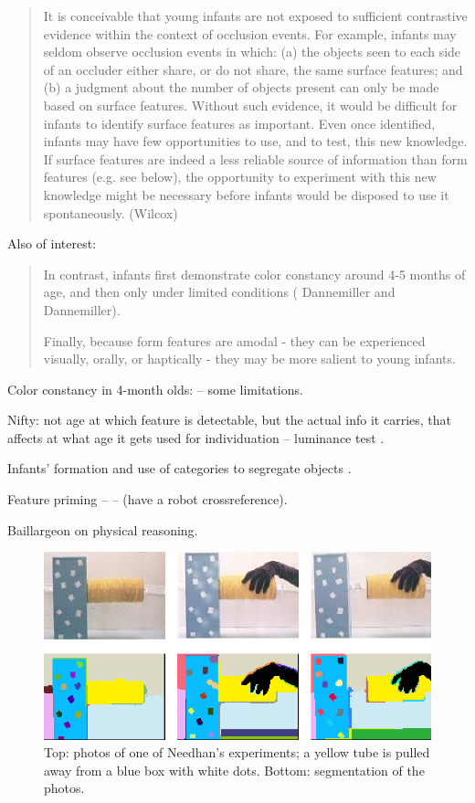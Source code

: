 \begin{quote}

It is conceivable that young infants are not exposed to sufficient
contrastive evidence within the context of occlusion events. For
example, infants may seldom observe occlusion events in which: (a) the
objects seen to each side of an occluder either share, or do not
share, the same surface features; and (b) a judgment about the number
of objects present can only be made based on surface features. Without
such evidence, it would be difficult for infants to identify surface
features as important. Even once identified, infants may have few
opportunities to use, and to test, this new knowledge. If surface
features are indeed a less reliable source of information than form
features (e.g. see below), the opportunity to experiment with this new
knowledge might be necessary before infants would be disposed to use
it spontaneously. (Wilcox)

\end{quote}



Also of interest:

\begin{quote}

In contrast, infants first demonstrate color constancy around 4-5
months of age, and then only under limited conditions ( Dannemiller
and Dannemiller).

Finally, because form features are amodal - they can be
experienced visually, orally, or haptically - they may be more
salient to young infants.

\end{quote}

Color constancy in 4-month olds: \cite{dannemiller87test} -- some 
limitations.

Nifty: not age at which feature is detectable, but the actual
info it carries, that affects at what age it gets used for
individuation -- luminance test \cite{woods05infants}.

Infants' formation and use of categories to segregate objects 
\cite{needham05infants}.

Feature priming -- \cite{wilcox04priming}
--
(have a robot crossreference).

Baillargeon on physical reasoning.


\begin{figure}

\centerline{\includegraphics[width=0.5\columnwidth]{fig-pull}}

\caption{
Top: photos of one of Needhan's experiments; a yellow tube is 
pulled away from a blue box with white dots.
Bottom: segmentation of the photos.
}

\label{fig:move-apart}

\end{figure}

